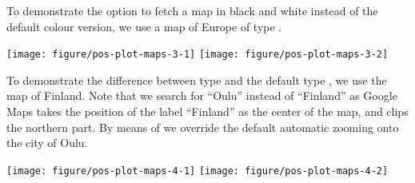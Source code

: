 \documentclass[paper=a4,10pt,div=17,headsepline,BCOR=12mm,twoside,open=right]{scrbook}\usepackage{knitr}
\begin{document}
To demonstrate the option to fetch a map in black and white instead of the default colour version, we use a map of Europe of type .



\begin{knitrout}\footnotesize
{}\color{fgcolor}\begin{kframe}
\begin{alltt}
 \hlkwb{<-} \hlstd{(}\hlstd{,} \hlstd{=}\hlstd{,}
                  \hlstd{=}\hlstd{)}

 \hlkwb{<-} \hlstd{(}\hlstd{,} \hlstd{=}\hlstd{,}
                  \hlstd{=}\hlstd{,}
                  \hlstd{=}\hlstd{)}
\end{alltt}
\end{kframe}

{\centering \texttt{[image: figure/pos-plot-maps-3-1]} 
\texttt{[image: figure/pos-plot-maps-3-2]} 

}



\end{knitrout}

To demonstrate the difference between type  and the default type , we use the map of Finland. Note that we search for ``Oulu'' instead of ``Finland'' as Google Maps takes the position of the label ``Finland'' as the center of the map, and clips the northern part. By means of  we override the default automatic zooming onto the city of Oulu.


\begin{knitrout}\footnotesize
{}\color{fgcolor}\begin{kframe}
\begin{alltt}
 \hlkwb{<-} \hlstd{(}\hlstd{,} \hlstd{=}\hlstd{,} \hlstd{=}\hlstd{)}

 \hlkwb{<-} \hlstd{(}\hlstd{,} \hlstd{=}\hlstd{,} \hlstd{=}\hlstd{)}
\end{alltt}
\end{kframe}

{\centering \texttt{[image: figure/pos-plot-maps-4-1]} 
\texttt{[image: figure/pos-plot-maps-4-2]} 

}



\end{knitrout}
\end{document}
